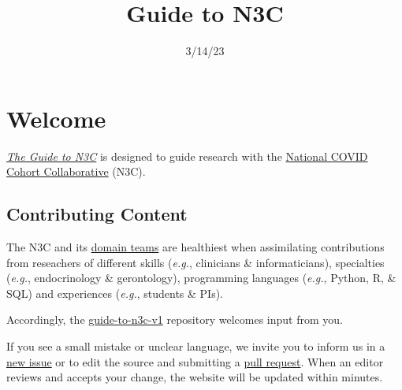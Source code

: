 \documentclass[
  letterpaper,
  DIV=11,
  numbers=noendperiod]{scrreprt}
\title{Guide to N3C}
\author{}
\date{3/14/23}
\renewcommand*\contentsname{Table of contents}
\newcommand\contentsname{Table of contents}
\begin{document}
\maketitle
\ifdefined\Shaded\renewenvironment{Shaded}{\begin{tcolorbox}[interior hidden, borderline west={3pt}{0pt}{shadecolor}, sharp corners, boxrule=0pt, frame hidden, enhanced, breakable]}{\end{tcolorbox}}\fi

\renewcommand*\contentsname{Table of contents}
{
\hypersetup{linkcolor=}
\setcounter{tocdepth}{2}
\tableofcontents
}

\hypertarget{welcome}{%
\chapter*{Welcome}\label{welcome}}


\emph{\href{https://national-covid-cohort-collaborative.github.io/guide-to-n3c-v1/}{The
Guide to N3C}} is designed to guide research with the
\href{https://ncats.nih.gov/n3c}{National COVID Cohort Collaborative}
(N3C).

\hypertarget{contributing-content}{%
\section*{Contributing Content}\label{contributing-content}}


The N3C and its \href{https://covid.cd2h.org/domain-teams}{domain teams}
are healthiest when assimilating contributions from reseachers of
different skills (\emph{e.g.}, clinicians \& informaticians),
specialties (\emph{e.g.}, endocrinology \& gerontology), programming
languages (\emph{e.g.}, Python, R, \& SQL) and experiences (\emph{e.g.},
students \& PIs).

Accordingly, the
\href{https://github.com/National-COVID-Cohort-Collaborative/guide-to-n3c-v1}{guide-to-n3c-v1}
repository welcomes input from you.

If you see a small mistake or unclear language, we invite you to inform
us in a
\href{https://github.com/National-COVID-Cohort-Collaborative/guide-to-n3c-v1/issues}{new
issue} or to edit the source and submitting a
\href{https://docs.github.com/en/github/collaborating-with-pull-requests/proposing-changes-to-your-work-with-pull-requests/about-pull-requests}{pull
request}. When an editor reviews and accepts your change, the website
will be updated within minutes.
\end{document}
